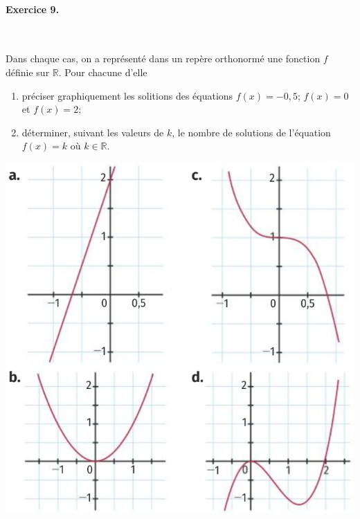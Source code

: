 \documentclass[11pt]{article}
\begin{document}
\paragraph{Exercice 9.}~\\
\begin{minipage}{.5\textwidth}
  Dans chaque cas, on a représenté dans un repère orthonormé une fonction $f$
  définie sur $\mathbb{R}$. Pour chacune d'elle
  \begin{enumerate}
    \item préciser graphiquement les solitions des équations $f(x)=-0,5$;
      $f(x)=0$ et $f(x)=2$;
    \item déterminer, suivant les valeurs de $k$, le nombre de solutions de
      l'équation $f(x)=k$ où $k\in\mathbb{R}$.
  \end{enumerate}
\end{minipage}
\begin{minipage}{.5\textwidth}
  \begin{center}
    \includegraphics[scale=.3]{4fonctions.png}
  \end{center}
\end{minipage}
\end{document}
